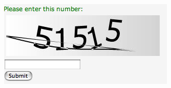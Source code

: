 \documentclass[8pt]{beamer}
\begin{document}
\begin{frame}
\begin{columns}[T]
\begin{column}{.5\textwidth}
       \includegraphics[width=\textwidth]{imgs/captcha.jpg}
      \end{column}
      
     \end{columns}   
  \end{frame}
\end{document}
